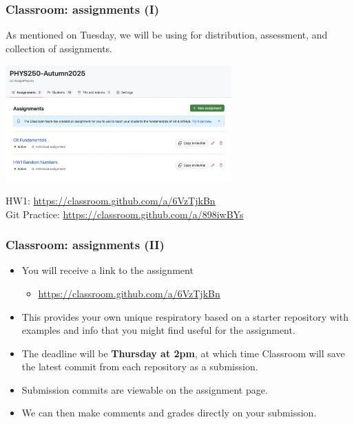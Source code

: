 \documentclass[hyperref={colorlinks=true}]{beamer}
\begin{document}
\begin{frame}%
  \frametitle{\github Classroom: assignments (I)}
  
  As mentioned on Tuesday, we will be using \github for distribution, assessment, and collection of assignments. 
  
  \begin{center}
    \includegraphics[width=0.65\textwidth]{GitHubClassroom-Assignment1.png}
  \end{center}
  
  
  \centering HW1: \url{https://classroom.github.com/a/6VzTjkBn} \\
  \centering Git Practice: \url{https://classroom.github.com/a/898iwBYs}

\end{frame}


\begin{frame}%
  \frametitle{\github Classroom: assignments (II)}
  
  \begin{itemize}
    \item You will receive a link to the assignment
    \begin{itemize}
      \item \url{https://classroom.github.com/a/6VzTjkBn}
    \end{itemize}
    \item This provides your own unique respiratory based on a starter repository with examples and info that you might find useful for the assignment. 
    \item The deadline will be \textbf{Thursday at 2pm}, at which time \github Classroom will save the latest commit from each repository as a submission. 
    \item Submission commits are viewable  on the assignment page. 
    \item We can then make comments and grades directly on your submission.
  \end{itemize}
  


\end{frame}
\end{document}
